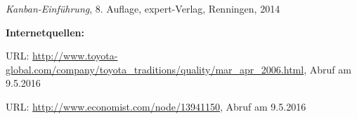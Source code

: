 \begin{thebibliography}{}
	 {\sl Kanban-Einführung}, 8. Auflage, expert-Verlag, Renningen, 2014
	
	
	\textbf{Internetquellen:}


	 URL: \url{http://www.toyota-global.com/company/toyota_traditions/quality/mar_apr_2006.html}, Abruf am 9.5.2016
	
	 URL: \url{http://www.economist.com/node/13941150}, Abruf am 9.5.2016	
	
  \end{thebibliography}
